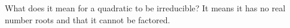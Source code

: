 {What does it mean for a quadratic to be irreducible?}
{It means it has no real number roots and that it cannot be factored.}
